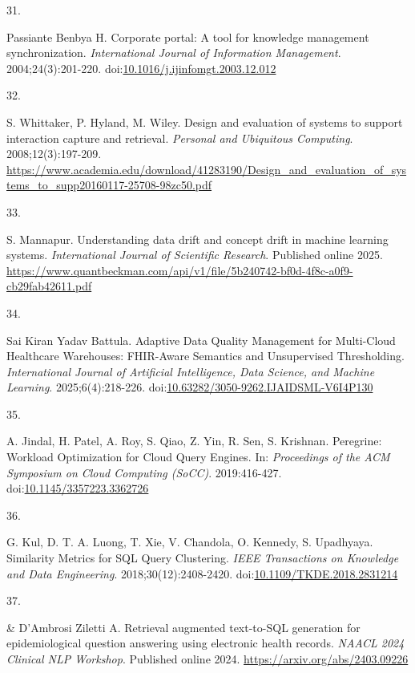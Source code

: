 \documentclass[
  american,
  11pt,
  letterpaper,
  oneside  ,captions=tableheading
]{scrartcl}
\newlength{\cslhangindent}
\newlength{\csllabelwidth}
\newenvironment{CSLReferences}[2] %
 {\begin{list}{}{%
  \setlength{\itemindent}{0pt}
  \setlength{\leftmargin}{0pt}
  \setlength{\parsep}{0pt}
  \ifodd #1
   \setlength{\leftmargin}{\cslhangindent}
   \setlength{\itemindent}{-1\cslhangindent}
  \fi
  \setlength{\itemsep}{#2\baselineskip}}}
 {\end{list}}
\newcommand{\CSLLeftMargin}[1]{\parbox[t]{\csllabelwidth}{\strut#1\strut}}
\newcommand{\CSLRightInline}[1]{\parbox[t]{\linewidth - \csllabelwidth}{\strut#1\strut}}
\begin{document}
\begin{CSLReferences}{0}{1}
\CSLLeftMargin{31. }%
\CSLRightInline{Passiante Benbya H. {Corporate portal: A tool for
knowledge management synchronization}. \emph{International Journal of
Information Management}. 2004;24(3):201-220.
doi:\href{https://doi.org/10.1016/j.ijinfomgt.2003.12.012}{10.1016/j.ijinfomgt.2003.12.012}}

\CSLLeftMargin{32. }%
\CSLRightInline{S. Whittaker, P. Hyland, M. Wiley. Design and evaluation
of systems to support interaction capture and retrieval. \emph{Personal
and Ubiquitous Computing}. 2008;12(3):197-209.
\url{https://www.academia.edu/download/41283190/Design_and_evaluation_of_systems_to_supp20160117-25708-98zc50.pdf}}

\CSLLeftMargin{33. }%
\CSLRightInline{S. Mannapur. Understanding data drift and concept drift
in machine learning systems. \emph{International Journal of Scientific
Research}. Published online 2025.
\url{https://www.quantbeckman.com/api/v1/file/5b240742-bf0d-4f8c-a0f9-cb29fab42611.pdf}}

\CSLLeftMargin{34. }%
\CSLRightInline{Sai Kiran Yadav Battula. {Adaptive Data Quality
Management for Multi-Cloud Healthcare Warehouses: FHIR-Aware Semantics
and Unsupervised Thresholding}. \emph{International Journal of
Artificial Intelligence, Data Science, and Machine Learning}.
2025;6(4):218-226.
doi:\href{https://doi.org/10.63282/3050-9262.IJAIDSML-V6I4P130}{10.63282/3050-9262.IJAIDSML-V6I4P130}}

\CSLLeftMargin{35. }%
\CSLRightInline{A. Jindal, H. Patel, A. Roy, S. Qiao, Z. Yin, R. Sen, S.
Krishnan. {Peregrine: Workload Optimization for Cloud Query Engines}.
In: \emph{Proceedings of the ACM Symposium on Cloud Computing (SoCC)}.
2019:416-427.
doi:\href{https://doi.org/10.1145/3357223.3362726}{10.1145/3357223.3362726}}

\CSLLeftMargin{36. }%
\CSLRightInline{G. Kul, D. T. A. Luong, T. Xie, V. Chandola, O. Kennedy,
S. Upadhyaya. {Similarity Metrics for SQL Query Clustering}. \emph{IEEE
Transactions on Knowledge and Data Engineering}. 2018;30(12):2408-2420.
doi:\href{https://doi.org/10.1109/TKDE.2018.2831214}{10.1109/TKDE.2018.2831214}}

\CSLLeftMargin{37. }%
\CSLRightInline{\& D'Ambrosi Ziletti A. {Retrieval augmented text-to-SQL
generation for epidemiological question answering using electronic
health records}. \emph{{NAACL} 2024 Clinical {NLP} Workshop}. Published
online 2024. \url{https://arxiv.org/abs/2403.09226}}


\end{CSLReferences}
\end{document}
